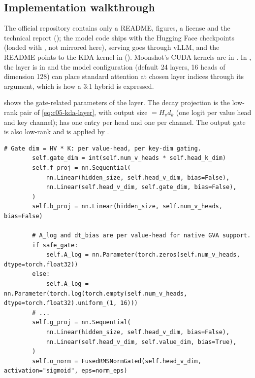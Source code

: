 \subsection{Implementation walkthrough}\label{sec:c05-kda-impl}

\begin{implnote}[title={In the code: where KDA lives}]
The official repository  contains only a README, figures, a license
and the technical report (); the model code
ships with the Hugging Face checkpoints (loaded with , not mirrored
here), serving goes through vLLM, and the README points to the KDA kernel in \fla{}
(). Moonshot's CUDA kernels are in . In \fla{}, the
layer is  in 
and the model configuration  (default 24 layers, 16 heads of dimension 128) can
place standard attention at chosen layer indices through its  argument, which is how a
3:1 hybrid is expressed.
\end{implnote}

 shows the gate-related parameters of the \fla{} layer. The decay
projection  is the low-rank pair of \cref{eq:c05-kda-layer}, with output size
 $= H_v d_k$ (one logit per value head and key channel);  has one entry
per head and  one per channel. The output gate  is also low-rank and is
applied by .

\begin{lstlisting}[caption={Excerpt from \texttt{repos/\allowbreak{}fla-org\_\_flash-linear-attention/\allowbreak{}fla/\allowbreak{}layers/\allowbreak{}kda.py} (gate parameters of \texttt{KimiDeltaAttention})},label={lst:c05-kda-layer}]
        # Gate dim = HV * K: per value-head, per key-dim gating.
        self.gate_dim = int(self.num_v_heads * self.head_k_dim)
        self.f_proj = nn.Sequential(
            nn.Linear(hidden_size, self.head_v_dim, bias=False),
            nn.Linear(self.head_v_dim, self.gate_dim, bias=False),
        )
        self.b_proj = nn.Linear(hidden_size, self.num_v_heads, bias=False)

        # A_log and dt_bias are per value-head for native GVA support.
        if safe_gate:
            self.A_log = nn.Parameter(torch.zeros(self.num_v_heads, dtype=torch.float32))
        else:
            self.A_log = nn.Parameter(torch.log(torch.empty(self.num_v_heads, dtype=torch.float32).uniform_(1, 16)))
        # ...
        self.g_proj = nn.Sequential(
            nn.Linear(hidden_size, self.head_v_dim, bias=False),
            nn.Linear(self.head_v_dim, self.value_dim, bias=True),
        )
        self.o_norm = FusedRMSNormGated(self.head_v_dim, activation="sigmoid", eps=norm_eps)
\end{lstlisting}

